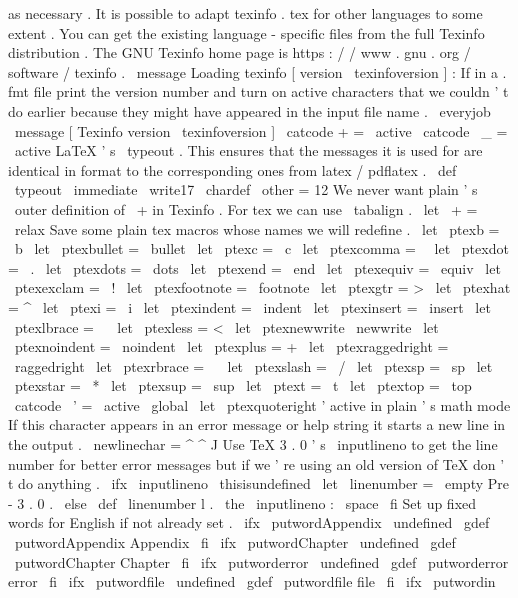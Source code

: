as
necessary
.
%
%
It
is
possible
to
adapt
texinfo
.
tex
for
other
languages
to
some
%
extent
.
You
can
get
the
existing
language
-
specific
files
from
the
%
full
Texinfo
distribution
.
%
%
The
GNU
Texinfo
home
page
is
https
:
/
/
www
.
gnu
.
org
/
software
/
texinfo
.
\
message
{
Loading
texinfo
[
version
\
texinfoversion
]
:
}
%
If
in
a
.
fmt
file
print
the
version
number
%
and
turn
on
active
characters
that
we
couldn
'
t
do
earlier
because
%
they
might
have
appeared
in
the
input
file
name
.
\
everyjob
{
\
message
{
[
Texinfo
version
\
texinfoversion
]
}
%
\
catcode
+
=
\
active
\
catcode
\
_
=
\
active
}
%
LaTeX
'
s
\
typeout
.
This
ensures
that
the
messages
it
is
used
for
%
are
identical
in
format
to
the
corresponding
ones
from
latex
/
pdflatex
.
\
def
\
typeout
{
\
immediate
\
write17
}
%
\
chardef
\
other
=
12
%
We
never
want
plain
'
s
\
outer
definition
of
\
+
in
Texinfo
.
%
For
tex
we
can
use
\
tabalign
.
\
let
\
+
=
\
relax
%
Save
some
plain
tex
macros
whose
names
we
will
redefine
.
\
let
\
ptexb
=
\
b
\
let
\
ptexbullet
=
\
bullet
\
let
\
ptexc
=
\
c
\
let
\
ptexcomma
=
\
\
let
\
ptexdot
=
\
.
\
let
\
ptexdots
=
\
dots
\
let
\
ptexend
=
\
end
\
let
\
ptexequiv
=
\
equiv
\
let
\
ptexexclam
=
\
!
\
let
\
ptexfootnote
=
\
footnote
\
let
\
ptexgtr
=
>
\
let
\
ptexhat
=
^
\
let
\
ptexi
=
\
i
\
let
\
ptexindent
=
\
indent
\
let
\
ptexinsert
=
\
insert
\
let
\
ptexlbrace
=
\
{
\
let
\
ptexless
=
<
\
let
\
ptexnewwrite
\
newwrite
\
let
\
ptexnoindent
=
\
noindent
\
let
\
ptexplus
=
+
\
let
\
ptexraggedright
=
\
raggedright
\
let
\
ptexrbrace
=
\
}
\
let
\
ptexslash
=
\
/
\
let
\
ptexsp
=
\
sp
\
let
\
ptexstar
=
\
*
\
let
\
ptexsup
=
\
sup
\
let
\
ptext
=
\
t
\
let
\
ptextop
=
\
top
{
\
catcode
\
'
=
\
active
\
global
\
let
\
ptexquoteright
'
}
%
active
in
plain
'
s
math
mode
%
If
this
character
appears
in
an
error
message
or
help
string
it
%
starts
a
new
line
in
the
output
.
\
newlinechar
=
^
^
J
%
Use
TeX
3
.
0
'
s
\
inputlineno
to
get
the
line
number
for
better
error
%
messages
but
if
we
'
re
using
an
old
version
of
TeX
don
'
t
do
anything
.
%
\
ifx
\
inputlineno
\
thisisundefined
\
let
\
linenumber
=
\
empty
%
Pre
-
3
.
0
.
\
else
\
def
\
linenumber
{
l
.
\
the
\
inputlineno
:
\
space
}
\
fi
%
Set
up
fixed
words
for
English
if
not
already
set
.
\
ifx
\
putwordAppendix
\
undefined
\
gdef
\
putwordAppendix
{
Appendix
}
\
fi
\
ifx
\
putwordChapter
\
undefined
\
gdef
\
putwordChapter
{
Chapter
}
\
fi
\
ifx
\
putworderror
\
undefined
\
gdef
\
putworderror
{
error
}
\
fi
\
ifx
\
putwordfile
\
undefined
\
gdef
\
putwordfile
{
file
}
\
fi
\
ifx
\
putwordin
